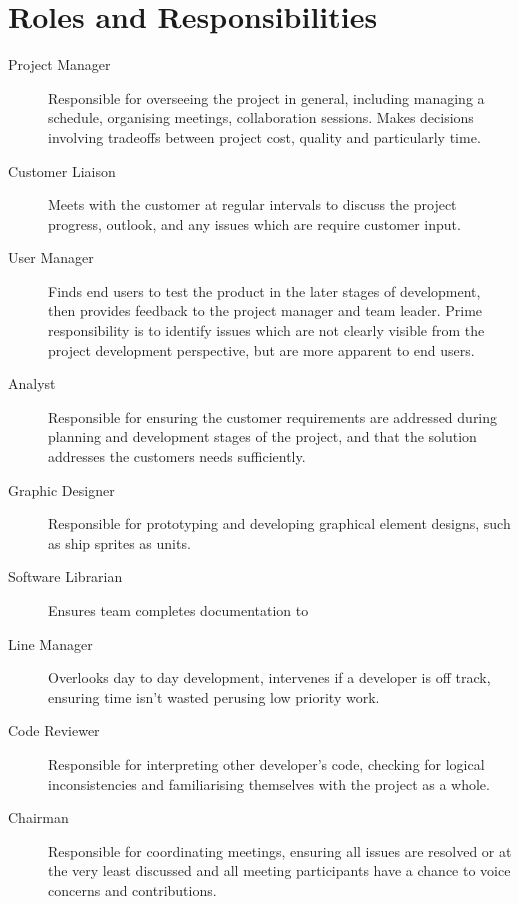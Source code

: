 \section{Roles and Responsibilities}
\label{section:roles}

\begin{description}
    \item[Project Manager] Responsible for overseeing the project in general, including managing a schedule, organising meetings, collaboration sessions. Makes decisions involving tradeoffs between project cost, quality and particularly time. 
     
    \item[Customer Liaison] Meets with the customer at regular intervals to discuss the project progress, outlook, and any issues which are require customer input.
     
    \item[User Manager] Finds end users to test the product in the later stages of development, then provides feedback to the project manager and team leader. Prime responsibility is to identify issues which are not clearly visible from the project development perspective, but are more apparent to end users.
     
    \item[Analyst] Responsible for ensuring the customer requirements are addressed during planning and development stages of the project, and that the solution addresses the customers needs sufficiently.
     
    \item[Graphic Designer] Responsible for prototyping and developing graphical element designs, such as ship sprites as units.
     
    \item[Software Librarian] Ensures team completes documentation to
     
    \item[Line Manager] Overlooks day to day development, intervenes if a developer is off track, ensuring time isn't wasted perusing low priority work.
     
    \item[Code Reviewer] Responsible for interpreting other developer's code, checking for logical inconsistencies and familiarising themselves with the project as a whole.
     
    \item[Chairman] Responsible for coordinating meetings, ensuring all issues are resolved or at the very least discussed and all meeting participants have a chance to voice concerns and contributions.
     

\end{description}
